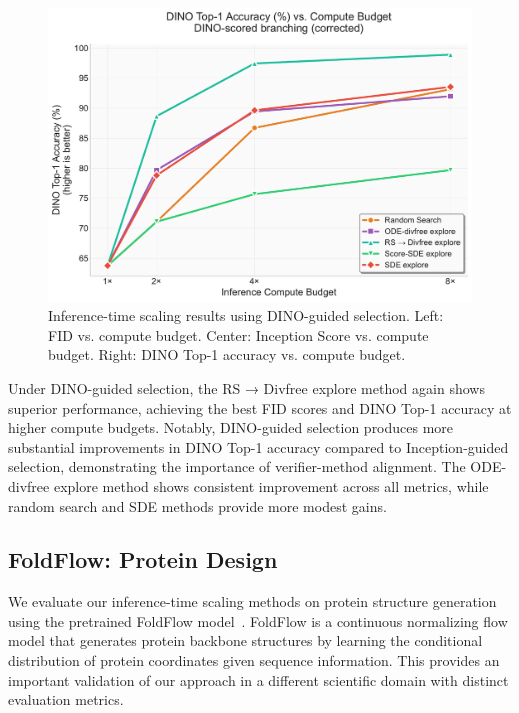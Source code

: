 \documentclass{article}
\begin{document}
\begin{figure}[H]
\begin{minipage}{0.32\textwidth}
  \end{minipage}
  \hfill
  \begin{minipage}{0.32\textwidth}
    \centering
    \includegraphics[width=\textwidth]{figures/scaling_dino_top1.pdf}
  \end{minipage}
  \caption{Inference-time scaling results using DINO-guided selection. Left: FID vs. compute budget. Center: Inception Score vs. compute budget. Right: DINO Top-1 accuracy vs. compute budget.}
  \label{fig:dino-scaling}
\end{figure}

Under DINO-guided selection, the RS → Divfree explore method again shows superior performance, achieving the best FID scores and DINO Top-1 accuracy at higher compute budgets. Notably, DINO-guided selection produces more substantial improvements in DINO Top-1 accuracy compared to Inception-guided selection, demonstrating the importance of verifier-method alignment. The ODE-divfree explore method shows consistent improvement across all metrics, while random search and SDE methods provide more modest gains.

\subsection{FoldFlow: Protein Design}

We evaluate our inference-time scaling methods on protein structure generation using the pretrained FoldFlow model~\cite{foldflow2}. FoldFlow is a continuous normalizing flow model that generates protein backbone structures by learning the conditional distribution of protein coordinates given sequence information. This provides an important validation of our approach in a different scientific domain with distinct evaluation metrics.
\end{document}
